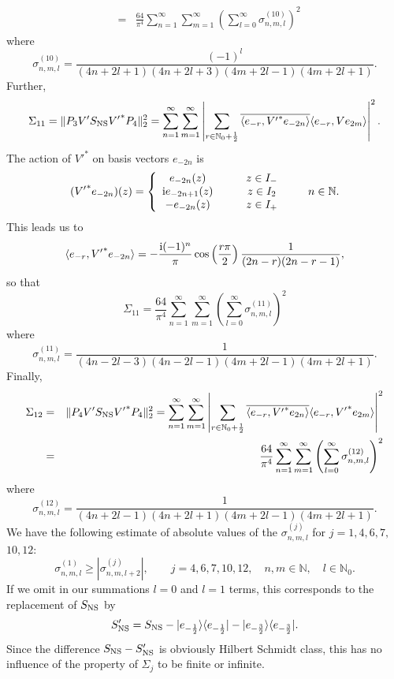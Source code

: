 \documentclass[10pt,a4paper]{article}
\begin{document}
\begin{appendix}
\begin{eqnarray*}
&=& \frac{64}{\pi^4} \sum_{n=1}^\infty
\sum_{m=1}^\infty  \left( \sum_{l=0}^\infty
\sigma_{n,m,l}^{(10)} \right)^2
\end{eqnarray*}
where
\[ \sigma_{n,m,l}^{(10)} = \frac{(-1)^l}{(4n+2l+1)(4n+2l+3)
(4m+2l-1)(4m+2l+1)}. \]
Further,
\[ \Sigma_{11} = \| P_3 V' S_{\rm NS} {V'}^* P_4 \|_2^2
= \sum_{n=1}^\infty \sum_{m=1}^\infty \left|
\sum_{r \in \mathbb{N}_0 +\frac{1}{2}}
\overline{ \langle e_{-r}, {V'}^* e_{-2n} \rangle }
\langle e_{-r}, V e_{2m} \rangle \right|^2 .\]
The action of ${V'}^*$ on basis vectors $e_{-2n}$ is
\[ ({V'}^*e_{-2n})(z) = \left\{ \begin{array}{cc} e_{-2n}(z) &
\qquad z \in I_- \\
{\rm i} e_{-2n+1}(z) & \qquad z \in I_2 \\ -e_{-2n}(z) & \qquad z
\in I_+ \end{array} \right. \qquad n\in\mathbb{N}.\]
This leads us to
\[ \langle e_{-r}, {V'}^*  e_{-2n} \rangle =
-\frac{{\rm i} (-1)^n}{\pi}
\cos\left(\frac{r\pi}{2}\right)\frac{1}{(2n-r)(2n-r-1)},\]
so that
\[ \Sigma_{11} = \frac{64}{\pi^4} \sum_{n=1}^\infty
\sum_{m=1}^\infty  \left( \sum_{l=0}^\infty
\sigma_{n,m,l}^{(11)} \right)^2 \]
where
\[ \sigma_{n,m,l}^{(11)} = \frac{1}{(4n-2l-3)(4n-2l-1)
(4m+2l-1)(4m+2l+1)}. \]
Finally,
\begin{eqnarray*}
\Sigma_{12} &=& \| P_4 V' S_{\rm NS} {V'}^* P_4 \|_2^2
= \sum_{n=1}^\infty \sum_{m=1}^\infty \left|
\sum_{r \in \mathbb{N}_0 +\frac{1}{2}}
\overline{ \langle e_{-r}, {V'}^* e_{2n} \rangle }
\langle e_{-r}, {V'}^* e_{2m} \rangle \right|^2 \\
&=& \frac{64}{\pi^4} \sum_{n=1}^\infty
\sum_{m=1}^\infty  \left( \sum_{l=0}^\infty
\sigma_{n,m,l}^{(12)} \right)^2
\end{eqnarray*}
where
\[ \sigma_{n,m,l}^{(12)} = \frac{1}{(4n+2l-1)(4n+2l+1)
(4m+2l-1)(4m+2l+1)}. \]
We have the following estimate of absolute values
of the $\sigma_{n,m,l}^{(j)}$ for $j=1,4,6,7,$ $10,12$:
\begin{equation}
\label{est}
\sigma_{n,m,l}^{(1)} \ge |\sigma_{n,m,l+2}^{(j)}|,
\qquad j=4,6,7,10,12, \quad n,m\in\mathbb{N},\quad
l\in\mathbb{N}_0.
\end{equation}
If we omit in our summations $l=0$ and $l=1$ terms,
this corresponds to the replacement of $S_{\rm NS}$ by
\[ S_{\rm NS}' = S_{\rm NS} - |e_{-\frac{1}{2}}\rangle\langle
e_{-\frac{1}{2}}| - |e_{-\frac{3}{2}}\rangle\langle
e_{-\frac{3}{2}}|. \]
Since the difference $S_{\rm NS}-S_{\rm NS}'$ is obviously
Hilbert Schmidt class, this has no influence of
the property of $\Sigma_j$ to be finite or infinite.

\end{appendix}
\end{document}
